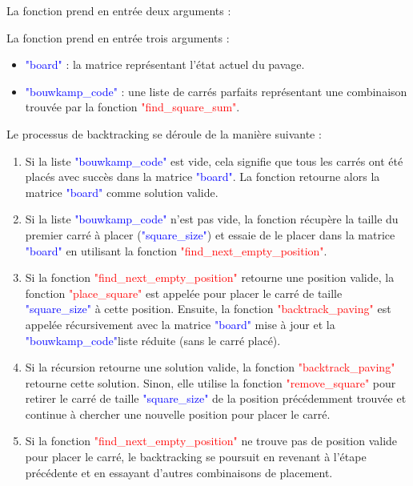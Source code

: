 \documentclass{article}
\begin{document}
La fonction prend en entrée deux arguments :

La fonction prend en entrée trois arguments :
\begin{itemize}
  \item \textcolor{blue}{"board"} : la matrice représentant l'état actuel du pavage.
  \item \textcolor{blue}{"bouwkamp\_code"} : une liste de carrés parfaits représentant une combinaison trouvée par la fonction \textcolor{red}{"find\_square\_sum"}.\newline
\end{itemize}

Le processus de backtracking se déroule de la manière suivante :\newline

\begin{enumerate}
  \item Si la liste \textcolor{blue}{"bouwkamp\_code"} est vide, cela signifie que tous les carrés ont été placés avec succès dans la matrice \textcolor{blue}{"board"}. La fonction retourne alors la matrice \textcolor{blue}{"board"} comme solution valide.
  \item Si la liste \textcolor{blue}{"bouwkamp\_code"} n'est pas vide, la fonction récupère la taille du premier carré à placer (\textcolor{blue}{"square\_size"}) et essaie de le placer dans la matrice \textcolor{blue}{"board"} en utilisant la fonction \textcolor{red}{"find\_next\_empty\_position"}.
  \item Si la fonction \textcolor{red}{"find\_next\_empty\_position"} retourne une position valide, la fonction \textcolor{red}{"place\_square"} est appelée pour placer le carré de taille \textcolor{blue}{"square\_size"} à cette position. Ensuite, la fonction \textcolor{red}{"backtrack\_paving"} est appelée récursivement avec la matrice \textcolor{blue}{"board"} mise à jour et la \textcolor{blue}{"bouwkamp\_code"}liste  réduite (sans le carré placé).
  \item Si la récursion retourne une solution valide, la fonction \textcolor{red}{"backtrack\_paving"} retourne cette solution. Sinon, elle utilise la fonction \textcolor{red}{"remove\_square"} pour retirer le carré de taille \textcolor{blue}{"square\_size"} de la position précédemment trouvée et continue à chercher une nouvelle position pour placer le carré.
  \item Si la fonction \textcolor{red}{"find\_next\_empty\_position"} ne trouve pas de position valide pour placer le carré, le backtracking se poursuit en revenant à l'étape précédente et en essayant d'autres combinaisons de placement.
\end{enumerate}
\end{document}
